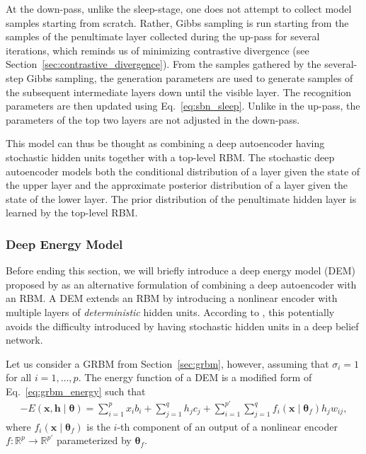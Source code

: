 \documentclass{now}
\newcommand{\vect}[1]{\mathbf{#1}}
\newcommand{\vects}[1]{\boldsymbol{#1}}
\newcommand{\vh}[0]{\vect{h}}
\newcommand{\vx}[0]{\vect{x}}
\newcommand{\TT}[0]{{\vects{\theta}}}
\newcommand{\RR}[0]{\mathbb{R}}
\begin{document}
At the down-pass, unlike the sleep-stage, one does not attempt to collect model
samples starting from scratch. Rather, Gibbs sampling is run starting from the
samples of the penultimate layer collected during the up-pass for several
iterations, which reminds us of minimizing contrastive divergence (see
Section~\ref{sec:contrastive_divergence}). From the samples gathered by the
several-step Gibbs sampling, the generation parameters are used to generate
samples of the subsequent intermediate layers down until the visible layer. The
recognition parameters are then updated using Eq.~\eqref{eq:sbn_sleep}. Unlike
in the up-pass, the parameters of the top two layers are not adjusted
in the down-pass.

This model can thus be thought as combining a deep autoencoder having stochastic
hidden units together with a top-level RBM. The stochastic deep autoencoder
models both the conditional distribution of a layer given the state of the upper
layer and the approximate posterior distribution of a layer given the state of
the lower layer. The prior distribution of the penultimate hidden layer is
learned by the top-level RBM.

\subsubsection{Deep Energy Model}

Before ending this section, we will briefly introduce a deep energy model
(DEM) proposed by \citet{Ngiam2011} as an
alternative formulation of combining a deep autoencoder with an RBM. A DEM
extends an RBM by introducing a nonlinear encoder with multiple layers of
\textit{deterministic} hidden units. According to \citet{Ngiam2011}, this
potentially avoids the difficulty introduced by having stochastic hidden units
in a deep belief network.

Let us consider a GRBM from Section~\ref{sec:grbm}, however, assuming that
$\sigma_i=1$ for all $i=1,\dots,p$. The energy function of a DEM is a modified
form of Eq.~\eqref{eq:grbm_energy} such that
\begin{align*}
    \label{eq:dem_energy}
    -E(\vx, \vh \mid \TT) = \sum_{i=1}^p x_i b_i
    + \sum_{j=1}^q h_j c_j +
    \sum_{i=1}^{p'} \sum_{j=1}^q f_i(\vx\mid \TT_f) h_j
    w_{ij},
\end{align*}
where $f_i(\vx \mid \TT_f)$ is the $i$-th component of an output of a nonlinear
encoder $f:\RR^p \to \RR^{p'}$ parameterized by $\TT_f$.
\end{document}
